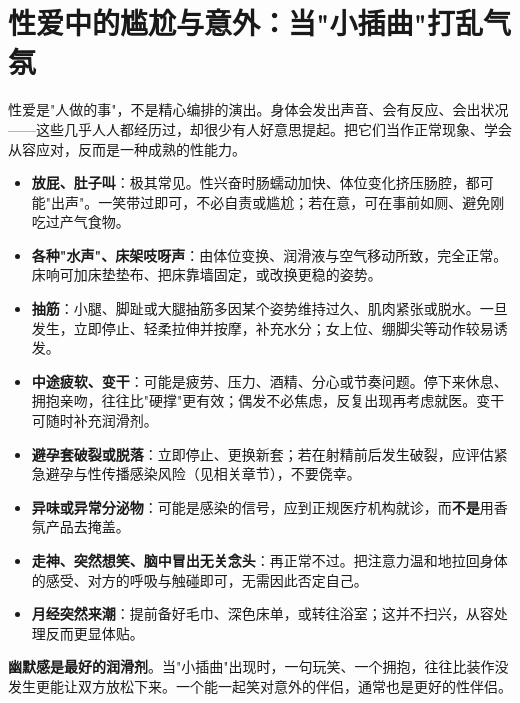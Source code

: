 \section{性爱中的尴尬与意外：当"小插曲"打乱气氛}

性爱是"人做的事"，不是精心编排的演出。身体会发出声音、会有反应、会出状况——这些几乎人人都经历过，却很少有人好意思提起。把它们当作正常现象、学会从容应对，反而是一种成熟的性能力。

\begin{itemize}
	\item \textbf{放屁、肚子叫}：极其常见。性兴奋时肠蠕动加快、体位变化挤压肠腔，都可能"出声"。一笑带过即可，不必自责或尴尬；若在意，可在事前如厕、避免刚吃过产气食物。
	\item \textbf{各种"水声"、床架吱呀声}：由体位变换、润滑液与空气移动所致，完全正常。床响可加床垫垫布、把床靠墙固定，或改换更稳的姿势。
	\item \textbf{抽筋}：小腿、脚趾或大腿抽筋多因某个姿势维持过久、肌肉紧张或脱水。一旦发生，立即停止、轻柔拉伸并按摩，补充水分；女上位、绷脚尖等动作较易诱发。
	\item \textbf{中途疲软、变干}：可能是疲劳、压力、酒精、分心或节奏问题。停下来休息、拥抱亲吻，往往比"硬撑"更有效；偶发不必焦虑，反复出现再考虑就医。变干可随时补充润滑剂。
	\item \textbf{避孕套破裂或脱落}：立即停止、更换新套；若在射精前后发生破裂，应评估紧急避孕与性传播感染风险（见相关章节），不要侥幸。
	\item \textbf{异味或异常分泌物}：可能是感染的信号，应到正规医疗机构就诊，而\textbf{不是}用香氛产品去掩盖。
	\item \textbf{走神、突然想笑、脑中冒出无关念头}：再正常不过。把注意力温和地拉回身体的感受、对方的呼吸与触碰即可，无需因此否定自己。
	\item \textbf{月经突然来潮}：提前备好毛巾、深色床单，或转往浴室；这并不扫兴，从容处理反而更显体贴。
\end{itemize}

\begin{tcolorbox}[colback=pink!5!white,colframe=red!50!black,title=贴心小叮咛]
\textbf{幽默感是最好的润滑剂}。当"小插曲"出现时，一句玩笑、一个拥抱，往往比装作没发生更能让双方放松下来。一个能一起笑对意外的伴侣，通常也是更好的性伴侣。
\end{tcolorbox}
